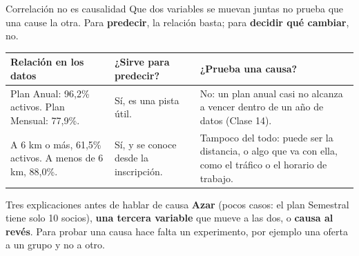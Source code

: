 \documentclass[aspectratio=169,11pt]{beamer}
\begin{document}
\begin{frame}[t]{Correlación no es causalidad}
  \small
  Que dos variables se muevan juntas no prueba que una cause la otra.
  Para \textbf{predecir}, la relación basta; para \textbf{decidir qué
  cambiar}, no.
  \vspace{0.1cm}
  \footnotesize
  \renewcommand{\arraystretch}{1.25}
  \begin{tabular}{@{}L{3.3cm}L{4.2cm}L{5.6cm}@{}}
    \toprule
    \textbf{Relación en los datos} & \textbf{¿Sirve para predecir?} & \textbf{¿Prueba una causa?} \\
    \midrule
    Plan Anual: 96,2\% activos. Plan Mensual: 77,9\%. & Sí, es una pista útil. & No: un plan anual casi no alcanza a vencer dentro de un año de datos (Clase 14). \\
    A 6 km o más, 61,5\% activos. A menos de 6 km, 88,0\%. & Sí, y se conoce desde la inscripción. & Tampoco del todo: puede ser la distancia, o algo que va con ella, como el tráfico o el horario de trabajo. \\
    \bottomrule
  \end{tabular}
  \vspace{0.15cm}
  \begin{alertblock}{Tres explicaciones antes de hablar de causa}
    \footnotesize \textbf{Azar} (pocos casos: el plan Semestral tiene solo
    10 socios), \textbf{una tercera variable} que mueve a las dos, o
    \textbf{causa al revés}. Para probar una causa hace falta un
    experimento, por ejemplo una oferta a un grupo y no a otro.
  \end{alertblock}
\end{frame}
\end{document}
